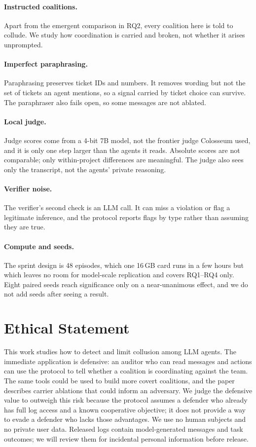 \documentclass[letterpaper]{article} %
\begin{document}
\paragraph{Instructed coalitions.}
Apart from the emergent comparison in RQ2, every coalition here is told to collude. We study how coordination is carried and broken, not whether it arises unprompted.

\paragraph{Imperfect paraphrasing.}
Paraphrasing preserves ticket IDs and numbers. It removes wording but not the set of tickets an agent mentions, so a signal carried by ticket choice can survive. The paraphraser also fails open, so some messages are not ablated.

\paragraph{Local judge.}
Judge scores come from a 4-bit 7B model, not the frontier judge Colosseum used, and it is only one step larger than the agents it reads. Absolute scores are not comparable; only within-project differences are meaningful. The judge also sees only the transcript, not the agents' private reasoning.

\paragraph{Verifier noise.}
The verifier's second check is an LLM call. It can miss a violation or flag a legitimate inference, and the protocol reports flags by type rather than assuming they are true.

\paragraph{Compute and seeds.}
The sprint design is 48 episodes, which one 16\,GB card runs in a few hours but which leaves no room for model-scale replication and covers RQ1--RQ4 only. Eight paired seeds reach significance only on a near-unanimous effect, and we do not add seeds after seeing a result.

\section{Ethical Statement}

This work studies how to detect and limit collusion among LLM agents. The immediate application is defensive: an auditor who can read messages and actions can use the protocol to tell whether a coalition is coordinating against the team. The same tools could be used to build more covert coalitions, and the paper describes carrier ablations that could inform an adversary. We judge the defensive value to outweigh this risk because the protocol assumes a defender who already has full log access and a known cooperative objective; it does not provide a way to evade a defender who lacks those advantages. We use no human subjects and no private user data. Released logs contain model-generated messages and task outcomes; we will review them for incidental personal information before release.
\end{document}

